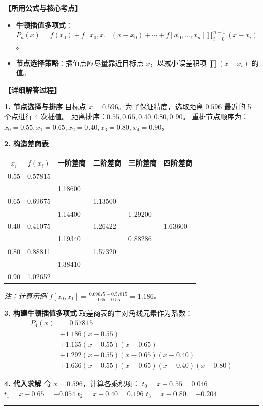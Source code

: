 \documentclass[a4paper,12pt]{ctexart}
\newcommand{\solitem}[3]{
    \vspace{1.5em}
    \begin{tcolorbox}[colback=gray!5!white, colframe=gray!50!black, title=\textbf{题目 #1}]
    \end{tcolorbox}
    
    \noindent\textbf{【所用公式与核心考点】}
    \begin{itemize}[leftmargin=2em, label=$\diamond$]
        #2
    \end{itemize}
    
    \noindent\textbf{【详细解答过程】}
    \par
    #3
    \par
    \vspace{1em}
    \hrule
}
\begin{document}
\solitem{[4]}{
    \item \textbf{牛顿插值多项式}：
    $P_n(x) = f(x_0) + f[x_0,x_1](x-x_0) + \cdots + f[x_0,\dots,x_n]\prod_{i=0}^{n-1}(x-x_i)$。
    \item \textbf{节点选择策略}：插值点应尽量靠近目标点 $x$，以减小误差积项 $\prod (x-x_i)$ 的值。
}{
    \textbf{1. 节点选择与排序}
    目标点 $x=0.596$。为了保证精度，选取距离 $0.596$ 最近的 5 个点进行 4 次插值。
    距离排序：$0.55, 0.65, 0.40, 0.80, 0.90$。
    重排节点顺序为：$x_0=0.55, x_1=0.65, x_2=0.40, x_3=0.80, x_4=0.90$。
  
    \textbf{2. 构造差商表}
    \begin{table}[H]
    \centering
    \small
    \begin{tabular}{c c l l l l}
    \toprule
    $x_i$ & $f(x_i)$ & 一阶差商 & 二阶差商 & 三阶差商 & 四阶差商 \\ 
    \midrule
    0.55 & 0.57815 & & & & \\
         &         & 1.18600 & & & \\
    0.65 & 0.69675 &         & 1.13500 & & \\
         &         & 1.14400 &         & 1.29200 & \\
    0.40 & 0.41075 &         & 1.26422 &         & 1.63600 \\
         &         & 1.19340 &         & 0.88286 & \\
    0.80 & 0.88811 &         & 1.57320 &         & \\
         &         & 1.38410 &         & & \\
    0.90 & 1.02652 &         & & & \\
    \bottomrule
    \end{tabular}
    \end{table}
    \textit{注：计算示例 $f[x_0, x_1] = \frac{0.69675-0.57815}{0.65-0.55} = 1.186$。}
  
    \textbf{3. 构建牛顿插值多项式}
    取差商表的主对角线元素作为系数：
    \begin{align*}
    P_4(x) &= 0.57815 \\
           &+ 1.186(x-0.55) \\
           &+ 1.135(x-0.55)(x-0.65) \\
           &+ 1.292(x-0.55)(x-0.65)(x-0.40) \\
           &+ 1.636(x-0.55)(x-0.65)(x-0.40)(x-0.80)
    \end{align*}
  
    \textbf{4. 代入求解}
    令 $x = 0.596$，计算各乘积项：
    $t_0 = x-0.55 = 0.046$
    $t_1 = x-0.65 = -0.054$
    $t_2 = x-0.40 = 0.196$
    $t_3 = x-0.80 = -0.204$
  
}
\end{document}
